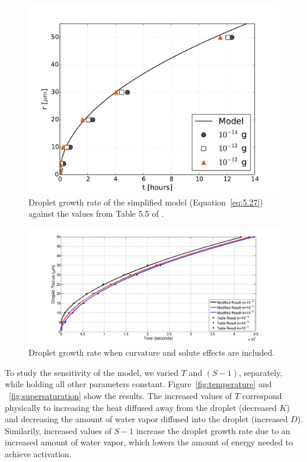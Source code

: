 \documentclass[]{article}
\begin{document}
\begin{figure}[h]
    \centering
    \includegraphics[width=\textwidth]{r_t.pdf}
    \caption{Droplet growth rate of the simplified model (Equation~\eqref{eq:5.27}) against the values from Table 5.5 of \cite{Curry}.}
    \label{fig:r_t}
\end{figure}

\begin{figure}[h]
    \centering
    \includegraphics[width=\textwidth]{r_t_modified.jpg}
    \caption{Droplet growth rate when curvature and solute effects are included.}
    \label{fig:r_t_modified}
\end{figure}


To study the sensitivity of the model, we varied $T$ and $(S - 1)$, separately,
while holding all other parameters constant. Figure~\ref{fig:temperature} and
~\ref{fig:supersaturation} show the results. The increased values of $T$
correspond physically to increasing the heat diffused away from the droplet
(decreased $K$) and decreasing the amount of water vapor diffused into the
droplet (increased $D$).  Similarily, increased values of $S - 1$ increase the
droplet growth rate due to an increased amount of water vapor, which lowers the
amount of energy needed to achieve activation.
\end{document}

